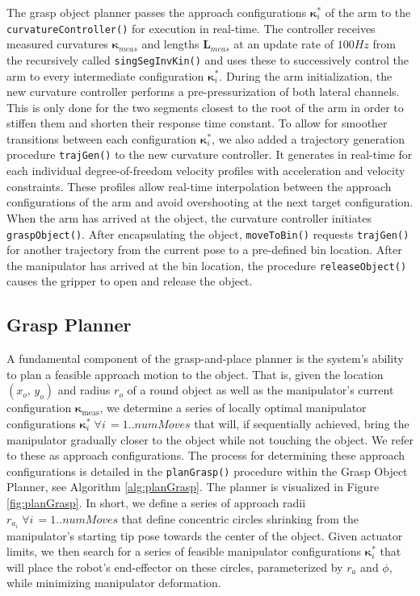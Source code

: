 The grasp object planner passes the approach configurations $\boldsymbol{\kappa}_i^*$ of the arm to the \texttt{curvatureController()} for execution in real-time.
The controller receives measured curvatures $\boldsymbol{\kappa}_{meas}$ and lengths $\boldsymbol{L}_{meas}$ at an update rate of $100\unit{Hz}$ from the recursively called \texttt{singSegInvKin()} and uses these to successively control the arm to every intermediate configuration $\boldsymbol{\kappa}_i^*$.
During the arm initialization, the new curvature controller performs a pre-pressurization of both lateral channels. 
This is only done for the two segments closest to the root of the arm in order to stiffen them and shorten their response time constant.  
To allow for smoother transitions between each configuration $\boldsymbol{\kappa}_i^*$, we also added a trajectory generation procedure \texttt{trajGen()} to the new curvature controller. It generates in real-time for each individual degree-of-freedom velocity profiles with acceleration and velocity constraints.
These profiles allow real-time interpolation between the approach configurations of the arm and avoid overshooting at the next target configuration.
When the arm has arrived at the object, the curvature controller initiates \texttt{graspObject()}.
After encapsulating the object, \texttt{moveToBin()} requests \texttt{trajGen()} for another trajectory from the current pose to a pre-defined bin location.
After the manipulator has arrived at the bin location, the procedure \texttt{releaseObject()} causes the gripper to open and release the object.

\subsection{Grasp Planner}
\label{subsec:grasp_planner}
A fundamental component of the grasp-and-place planner is the system's ability to plan a feasible approach motion to the object.
That is, given the location $\left(x_o, \, y_o\right)$ and radius $r_o$ of a round object as well as the manipulator's current configuration $\boldsymbol{\kappa}_{\textrm{meas}}$, we determine a series of locally optimal manipulator configurations $\boldsymbol{\kappa}_i^* \; \forall i \, = 1.. numMoves$ that will, if sequentially achieved, bring the manipulator gradually closer to the object while  not touching the object.
We refer to these as approach configurations.
The process for determining these approach configurations is detailed in the \texttt{planGrasp()} procedure within the Grasp Object Planner, see Algorithm \ref{alg:planGrasp}.
The planner is visualized in Figure \ref{fig:planGrasp}.
In short, we define a series of approach radii $r_{a_i} \;  \forall i\, = 1.. numMoves$ that define concentric circles shrinking from the manipulator's starting tip pose towards the center of the object.
Given actuator limits, we then search for a series of feasible manipulator configurations $\boldsymbol{\kappa}_i^*$ that will place the robot's end-effector on these circles, parameterized by $r_a$ and $\phi$, while minimizing manipulator deformation.

